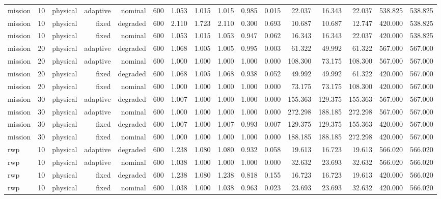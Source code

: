 \begin{tabular}{lrrrrrrrrrrrrrrr}
mission & 10 & physical & adaptive & nominal & 600 & 1.053 & 1.015 & 1.015 & 0.985 & 0.015 & 22.037 & 16.343 & 22.037 & 538.825 & 538.825 \\
mission & 10 & physical & fixed & degraded & 600 & 2.110 & 1.723 & 2.110 & 0.300 & 0.693 & 10.687 & 10.687 & 12.747 & 420.000 & 538.825 \\
mission & 10 & physical & fixed & nominal & 600 & 1.053 & 1.015 & 1.053 & 0.947 & 0.062 & 16.343 & 16.343 & 22.037 & 420.000 & 538.825 \\
mission & 20 & physical & adaptive & degraded & 600 & 1.068 & 1.005 & 1.005 & 0.995 & 0.003 & 61.322 & 49.992 & 61.322 & 567.000 & 567.000 \\
mission & 20 & physical & adaptive & nominal & 600 & 1.000 & 1.000 & 1.000 & 1.000 & 0.000 & 108.300 & 73.175 & 108.300 & 567.000 & 567.000 \\
mission & 20 & physical & fixed & degraded & 600 & 1.068 & 1.005 & 1.068 & 0.938 & 0.052 & 49.992 & 49.992 & 61.322 & 420.000 & 567.000 \\
mission & 20 & physical & fixed & nominal & 600 & 1.000 & 1.000 & 1.000 & 1.000 & 0.000 & 73.175 & 73.175 & 108.300 & 420.000 & 567.000 \\
mission & 30 & physical & adaptive & degraded & 600 & 1.007 & 1.000 & 1.000 & 1.000 & 0.000 & 155.363 & 129.375 & 155.363 & 567.000 & 567.000 \\
mission & 30 & physical & adaptive & nominal & 600 & 1.000 & 1.000 & 1.000 & 1.000 & 0.000 & 272.298 & 188.185 & 272.298 & 567.000 & 567.000 \\
mission & 30 & physical & fixed & degraded & 600 & 1.007 & 1.000 & 1.007 & 0.993 & 0.007 & 129.375 & 129.375 & 155.363 & 420.000 & 567.000 \\
mission & 30 & physical & fixed & nominal & 600 & 1.000 & 1.000 & 1.000 & 1.000 & 0.000 & 188.185 & 188.185 & 272.298 & 420.000 & 567.000 \\
rwp & 10 & physical & adaptive & degraded & 600 & 1.238 & 1.080 & 1.080 & 0.932 & 0.058 & 19.613 & 16.723 & 19.613 & 566.020 & 566.020 \\
rwp & 10 & physical & adaptive & nominal & 600 & 1.038 & 1.000 & 1.000 & 1.000 & 0.000 & 32.632 & 23.693 & 32.632 & 566.020 & 566.020 \\
rwp & 10 & physical & fixed & degraded & 600 & 1.238 & 1.080 & 1.238 & 0.818 & 0.155 & 16.723 & 16.723 & 19.613 & 420.000 & 566.020 \\
rwp & 10 & physical & fixed & nominal & 600 & 1.038 & 1.000 & 1.038 & 0.963 & 0.023 & 23.693 & 23.693 & 32.632 & 420.000 & 566.020 \\

\end{tabular}
